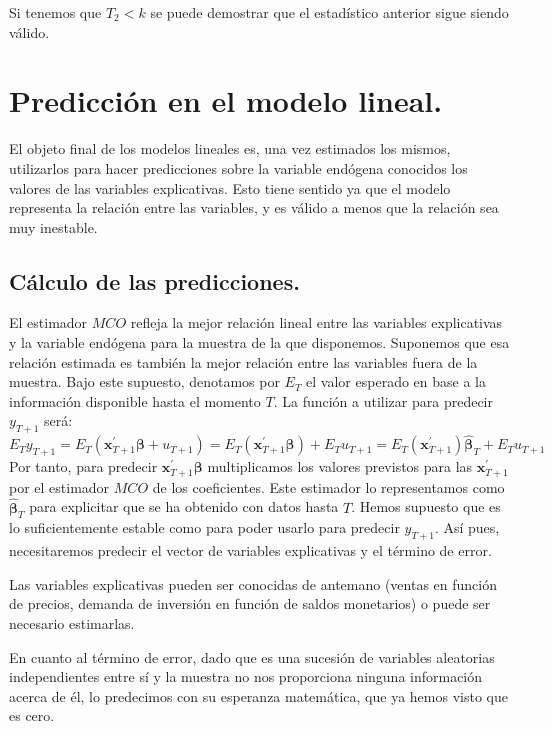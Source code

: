 Si tenemos que $T_{2}<k$ se puede demostrar que el estad\'istico anterior
sigue siendo v\'alido.


\section{Predicci\'on en el modelo lineal.}

El objeto final de los modelos lineales es, una vez estimados los
mismos, utilizarlos para hacer predicciones sobre la variable end\'ogena
conocidos los valores de las variables explicativas. Esto tiene sentido
ya que el modelo representa la relaci\'on entre las variables, y es
v\'alido a menos que la relaci\'on sea muy inestable.


\subsection{C\'alculo de las predicciones.}

El estimador $MCO$ refleja la mejor relaci\'on lineal entre las variables
explicativas y la variable end\'ogena para la muestra de la que disponemos.
Suponemos que esa relaci\'on estimada es tambi\'en la mejor relaci\'on entre
las variables fuera de la muestra. Bajo este supuesto, denotamos por
$E_{T}$ el valor esperado en base a la informaci\'on disponible hasta
el momento $T$. La funci\'on a utilizar para predecir $y_{T+1}$ ser\'a:
\[
E_{T}y_{T+1}=E_{T}\left(\boldsymbol{x}^{\prime}_{T+1}\boldsymbol{\beta}+u_{T+1}\right)=E_{T}\left(\boldsymbol{x}^{\prime}_{T+1}\boldsymbol{\beta}\right)+E_{T}u_{T+1}=E_{T}\left(\boldsymbol{x}^{\prime}_{T+1}\right)\hat{\boldsymbol{\beta}}_{T}+E_{T}u_{T+1}
\]
Por tanto, para predecir $\boldsymbol{x}^{\prime}_{T+1}\boldsymbol{\beta}$
multiplicamos los valores previstos para las $\boldsymbol{x}^{\prime}_{T+1}$
por el estimador $MCO$ de los coeficientes. Este estimador lo representamos
como $\hat{\boldsymbol{\beta}}_{T}$ para explicitar que se ha obtenido
con datos hasta $T$. Hemos supuesto que es lo suficientemente estable
como para poder usarlo para predecir $y_{T+1}$. As\'i pues, necesitaremos
predecir el vector de variables explicativas y el t\'ermino de error.

Las variables explicativas pueden ser conocidas de antemano (ventas
en funci\'on de precios, demanda de inversi\'on en funci\'on de saldos monetarios)
o puede ser necesario estimarlas.

En cuanto al t\'ermino de error, dado que es una sucesi\'on de variables
aleatorias independientes entre s\'i y la muestra no nos proporciona
ninguna informaci\'on acerca de \'el, lo predecimos con su esperanza matem\'atica,
que ya hemos visto que es cero.

